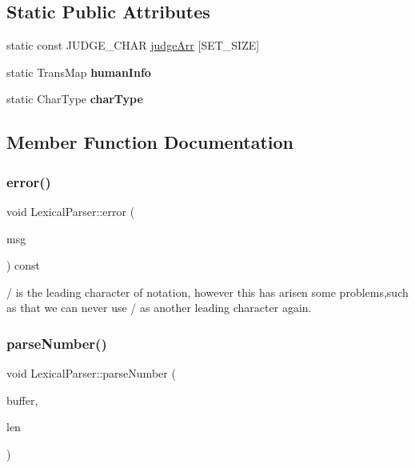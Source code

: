\subsection*{Static Public Attributes}
\begin{DoxyCompactItemize}
\item 
static const J\+U\+D\+G\+E\+\_\+\+C\+H\+AR \hyperlink{class_lexical_parser_a1786cf007498ae783ed4b02115a40268}{judge\+Arr} \mbox{[}S\+E\+T\+\_\+\+S\+I\+ZE\mbox{]}
\item 
\mbox{\label{class_lexical_parser_a379dc247745396a09907bab9c65ea8c5}} 
static Trans\+Map {\bfseries human\+Info}
\item 
\mbox{\label{class_lexical_parser_a00cab1e0c155eb4832376a3240cd3564}} 
static Char\+Type {\bfseries char\+Type}
\end{DoxyCompactItemize}


\subsection{Member Function Documentation}
\mbox{\label{class_lexical_parser_ac9fe754e7346c2bdebbe868ee2db1308}} 
\subsubsection{\texorpdfstring{error()}{error()}}
{\footnotesize\ttfamily void Lexical\+Parser\+::error (\begin{DoxyParamCaption}\item[{const char $\ast$}]{msg }\end{DoxyParamCaption}) const}

/ is the leading character of notation, however this has arisen some problems,such as that we can never use / as another leading character again. \mbox{\label{class_lexical_parser_a6cd877627322dd31c6a46273fc9b6894}} 
\subsubsection{\texorpdfstring{parse\+Number()}{parseNumber()}}
{\footnotesize\ttfamily void Lexical\+Parser\+::parse\+Number (\begin{DoxyParamCaption}\item[{const char $\ast$}]{buffer,  }\item[{size\+\_\+t}]{len }\end{DoxyParamCaption})\hspace{0.3cm}{\ttfamily [delete]}}

